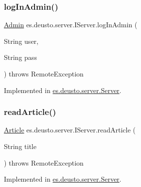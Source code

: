 \mbox{\label{interfacees_1_1deusto_1_1server_1_1_i_server_a65588c309522410e6a6d9c27d80821a7}} 
\subsubsection{\texorpdfstring{log\+In\+Admin()}{logInAdmin()}}
{\footnotesize\ttfamily \hyperlink{classes_1_1deusto_1_1server_1_1jdo_1_1_admin}{Admin} es.\+deusto.\+server.\+I\+Server.\+log\+In\+Admin (\begin{DoxyParamCaption}\item[{String}]{user,  }\item[{String}]{pass }\end{DoxyParamCaption}) throws Remote\+Exception}



Implemented in \hyperlink{classes_1_1deusto_1_1server_1_1_server_a654d408d0865f8e3f2c931da9e90283a}{es.\+deusto.\+server.\+Server}.

\mbox{\label{interfacees_1_1deusto_1_1server_1_1_i_server_a1f02a5aa0628909b5464141923f5d1d2}} 
\subsubsection{\texorpdfstring{read\+Article()}{readArticle()}}
{\footnotesize\ttfamily \hyperlink{classes_1_1deusto_1_1server_1_1jdo_1_1_article}{Article} es.\+deusto.\+server.\+I\+Server.\+read\+Article (\begin{DoxyParamCaption}\item[{String}]{title }\end{DoxyParamCaption}) throws Remote\+Exception}



Implemented in \hyperlink{classes_1_1deusto_1_1server_1_1_server_ac3af6f09e37d0b86743f8f46e39acdad}{es.\+deusto.\+server.\+Server}.

\mbox{\label{interfacees_1_1deusto_1_1server_1_1_i_server_a3b0fbbc1c934b8e527ecfed69e497155}} 
